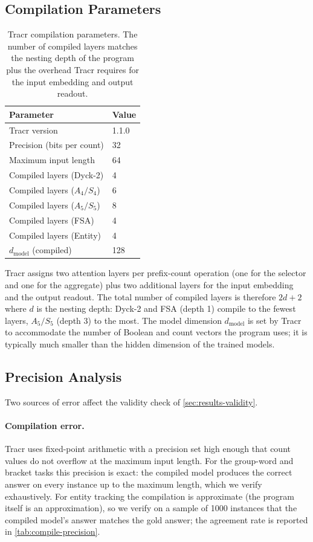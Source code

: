 \documentclass[11pt]{article}
\begin{document}
\subsection{Compilation Parameters}
\label{app:compile-params}

\begin{table}[t]
\centering\small
\begin{tabular}{@{}ll@{}}
\toprule
Parameter & Value \\
\midrule
Tracr version & 1.1.0 \\
Precision (bits per count) & 32 \\
Maximum input length & 64 \\
Compiled layers (Dyck-2) & 4 \\
Compiled layers ($A_4/S_4$) & 6 \\
Compiled layers ($A_5/S_5$) & 8 \\
Compiled layers (FSA) & 4 \\
Compiled layers (Entity) & 4 \\
$d_{\mathrm{model}}$ (compiled) & 128 \\
\bottomrule
\end{tabular}
\caption{Tracr compilation parameters. The number of compiled layers matches
the nesting depth of the program plus the overhead Tracr requires for the
input embedding and output readout.}
\label{tab:compile-params}
\end{table}

Tracr assigns two attention layers per prefix-count operation (one for the
selector and one for the aggregate) plus two additional layers for the input
embedding and the output readout. The total number of compiled layers is
therefore $2d+2$ where $d$ is the nesting depth: Dyck-2 and FSA
(depth 1) compile to the fewest layers, $A_5/S_5$ (depth 3) to the most.
The model dimension $d_{\mathrm{model}}$ is set by Tracr to accommodate the
number of Boolean and count vectors the program uses; it is typically much
smaller than the hidden dimension of the trained models.

\subsection{Precision Analysis}
\label{app:compile-precision}

Two sources of error affect the validity check of \cref{sec:results-validity}.

\paragraph{Compilation error.}
Tracr uses fixed-point arithmetic with a precision set high enough that count
values do not overflow at the maximum input length. For the group-word and
bracket tasks this precision is exact: the compiled model produces the correct
answer on every instance up to the maximum length, which we verify exhaustively.
For entity tracking the compilation is approximate (the program itself is an
approximation), so we verify on a sample of 1000 instances that the compiled
model's answer matches the gold answer; the agreement rate is reported in
\cref{tab:compile-precision}.
\end{document}
